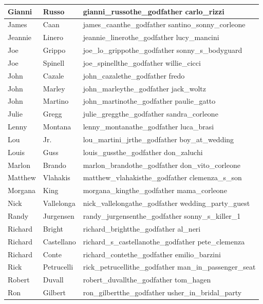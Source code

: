 \documentclass[12pt,a4paper]{article}
\begin{document}
\begin{longtable}{|l|l|p{6cm}|}
\hline
Gianni & Russo & gianni\_russothe\_godfather carlo\_rizzi \\
\hline
James & Caan & james\_caanthe\_godfather santino\_sonny\_corleone \\
\hline
Jeannie & Linero & jeannie\_linerothe\_godfather lucy\_mancini \\
\hline
Joe & Grippo & joe\_lo\_grippothe\_godfather sonny\_s\_bodyguard \\
\hline
Joe & Spinell & joe\_spinellthe\_godfather willie\_cicci \\
\hline
John & Cazale & john\_cazalethe\_godfather fredo \\
\hline
John & Marley & john\_marleythe\_godfather jack\_woltz \\
\hline
John & Martino & john\_martinothe\_godfather paulie\_gatto \\
\hline
Julie & Gregg & julie\_greggthe\_godfather sandra\_corleone \\
\hline
Lenny & Montana & lenny\_montanathe\_godfather luca\_brasi \\
\hline
Lou & Jr. & lou\_martini\_jrthe\_godfather boy\_at\_wedding \\
\hline
Louis & Guss & louis\_gussthe\_godfather don\_zaluchi \\
\hline
Marlon & Brando & marlon\_brandothe\_godfather don\_vito\_corleone \\
\hline
Matthew & Vlahakis & matthew\_vlahakisthe\_godfather clemenza\_s\_son \\
\hline
Morgana & King & morgana\_kingthe\_godfather mama\_corleone \\
\hline
Nick & Vallelonga & nick\_vallelongathe\_godfather wedding\_party\_guest \\
\hline
Randy & Jurgensen & randy\_jurgensenthe\_godfather sonny\_s\_killer\_1 \\
\hline
Richard & Bright & richard\_brightthe\_godfather al\_neri \\
\hline
Richard & Castellano & richard\_s\_castellanothe\_godfather pete\_clemenza \\
\hline
Richard & Conte & richard\_contethe\_godfather emilio\_barzini \\
\hline
Rick & Petrucelli & rick\_petrucellithe\_godfather man\_in\_passenger\_seat \\
\hline
Robert & Duvall & robert\_duvallthe\_godfather tom\_hagen \\
\hline
Ron & Gilbert & ron\_gilbertthe\_godfather usher\_in\_bridal\_party \\
\hline

\end{longtable}
\end{document}
